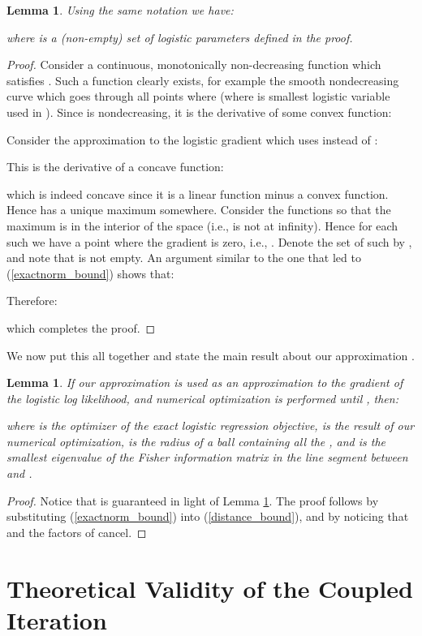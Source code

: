 \documentclass[11pt]{article}
\newtheorem{lem}[thm]{Lemma}
\begin{document}
\begin{lem}\label{lem_gradmin}
Using the same notation we have:

where  is a (non-empty) set of logistic parameters defined in the proof.
\end{lem}
\begin{proof}
Consider a continuous, monotonically non-decreasing function  which satisfies .  Such a function clearly exists, for example the smooth nondecreasing curve which goes through all points  where  (where  is  smallest logistic variable used in ).  Since  is nondecreasing, it is the derivative of some convex function:

Consider the approximation to the logistic gradient which uses  instead of :

This is the derivative of a concave function:

which is indeed concave since it is a linear function minus a convex function.  Hence  has a unique maximum somewhere. Consider the functions  so that the maximum is in the interior of the space  (i.e., is not at infinity).  Hence for each such  we have a point  where the gradient is zero, i.e., . Denote the set of such  by , and note that  is not empty. 
An argument similar to the one that led to (\ref{exactnorm_bound}) shows that:

Therefore:

which completes the proof.
\end{proof}

We now put this all together and state the main result about our approximation .

\begin{lem}
If our approximation  is used as an approximation to the gradient of the logistic log likelihood, and numerical optimization is performed until , then:

where  is the optimizer of the exact logistic regression objective,  is the result of our numerical optimization,  is the radius of a ball containing all the , and  is the smallest eigenvalue of the Fisher information matrix  in the line segment between  and . \end{lem}
\begin{proof}
Notice that  is guaranteed in light of Lemma \ref{lem_gradmin}. The proof follows by substituting (\ref{exactnorm_bound}) into (\ref{distance_bound}), and by noticing that  and  the factors of  cancel.
\end{proof}


\section{Theoretical Validity of the Coupled Iteration}\label{sec:validity_2}
\end{document}
